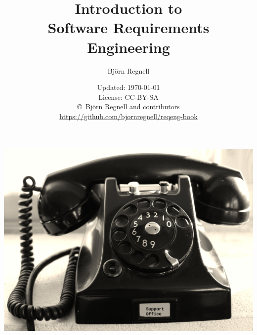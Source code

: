 \documentclass{reqengbook}
\title{
\bf\sffamily\fontsize{25}{30}\selectfont
Introduction to\\Software Requirements Engineering
}
\author{\sffamily\fontsize{20}{30}\selectfont Björn Regnell}
\date{\vspace{2em}\sffamily\small Updated: \today 
\\ License: CC-BY-SA 
\\ \copyright~Björn Regnell and contributors
\\ \url{https://github.com/bjornregnell/reqeng-book} 
}
\begin{document}

\begin{minipage}{0.5\textwidth}
  \maketitle%
\end{minipage}%
\begin{minipage}{0.5\textwidth}
  \centering\vspace{2.2cm}
  \includegraphics[width=1.0\textwidth]{../img/phone-support.jpg}%
\end{minipage}%
\pagebreak

\setcounter{tocdepth}{2}

\begin{multicols*}{2}  %
\footnotesize
\tableofcontents
\end{multicols*}



\end{document}
